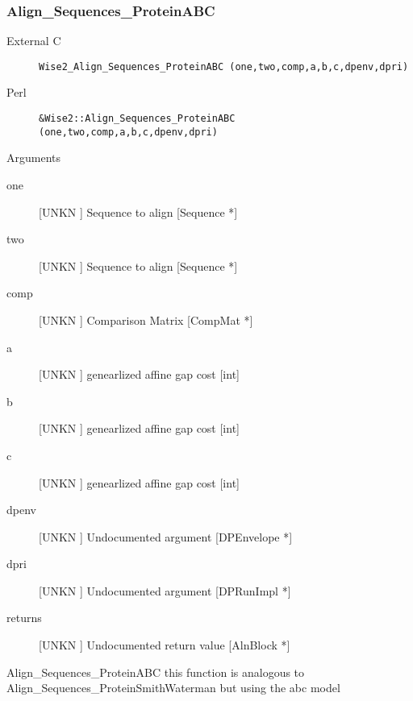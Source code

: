 \subsubsection{Align_Sequences_ProteinABC}
\begin{description}
\item[External C] {\tt Wise2_Align_Sequences_ProteinABC (one,two,comp,a,b,c,dpenv,dpri)}
\item[Perl] {\tt &Wise2::Align_Sequences_ProteinABC (one,two,comp,a,b,c,dpenv,dpri)}

\end{description}
Arguments
\begin{description}
\item[one] [UNKN ] Sequence to align [Sequence *]
\item[two] [UNKN ] Sequence to align [Sequence *]
\item[comp] [UNKN ] Comparison Matrix [CompMat *]
\item[a] [UNKN ] genearlized affine gap cost  [int]
\item[b] [UNKN ] genearlized affine gap cost  [int]
\item[c] [UNKN ] genearlized affine gap cost  [int]
\item[dpenv] [UNKN ] Undocumented argument [DPEnvelope *]
\item[dpri] [UNKN ] Undocumented argument [DPRunImpl *]
\item[returns] [UNKN ] Undocumented return value [AlnBlock *]
\end{description}
Align_Sequences_ProteinABC
this function is analogous to Align_Sequences_ProteinSmithWaterman
but using the abc model


